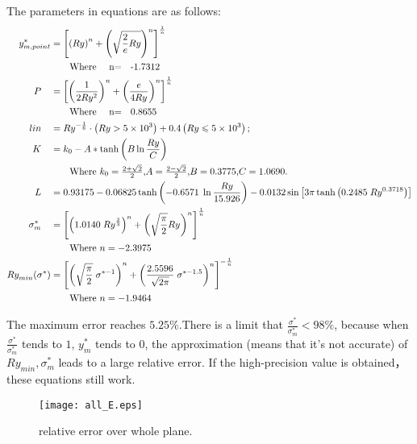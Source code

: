 \documentclass[review, 1p, number, sort&compress,table]{elsarticle}
\begin{document}
		The parameters in equations are as follows:
		\begin{align}
		\nonumber
			y_{m,point}^* &=\left[\left(Ry\right)^n+  \left( \sqrt{\frac{2}{e}Ry}\right)^n  \right]^{\frac{1}{n}}    
			\\ \nonumber &\quad \quad \mbox{\mbox{Where}  \quad  n= \; -1.7312}
			\\ \nonumber
			P \quad      & =\left[\left( \frac{1}{2Ry^{2}}\right)^n+  \left( \frac{e}{4Ry^{}}\right)^n  \right]^{\frac{1}{n}}    
			\\ \nonumber &\quad \quad \mbox{\mbox{Where}  \quad  n= \; 0.8655}
			\\  \nonumber 
			lin \quad      & =  Ry^{-\frac{1}{6}}  \cdot \left(Ry>5\times10^3\right) +0.4\left(Ry \leqslant 5\times10^3\right);   
			\\ \nonumber
			K \quad      &=k_0-A*\tanh{\left(B\ln{\frac{Ry}{C}}\right)}
			\\ \nonumber & \quad \quad \mbox{Where $k_0=\frac{2+\sqrt{2}}{2}$,$A=\frac{2-\sqrt{2}}{2}$,$B=0.3775$,$C=1.0690$.} 
			\\ \nonumber
			L \quad     &= 
			0.93175-0.06825\tanh\left({-0.6571 \; \ln\dfrac{Ry}{15.926}}\right)-0.0132\sin\left[3{\pi}\tanh\left(0.2485 \; Ry^{0.3718}\right)\right]
			\\ \nonumber
			\sigma^{*}_{m}\quad & =\left[ \left( 1.0140 \; Ry^{\frac{2}{3}}\right)^n+ \left( \sqrt{\frac{\pi}{2}}Ry^{}\right)^n\right]^\frac{1}{n}
			\\ \nonumber & \quad \quad\mbox{Where $n=-2.3975$}				
			\\ \nonumber
			Ry_{min}^{}(\sigma^{*})& = \left[ \left( \sqrt{\frac{\pi}{2}}    \; \sigma^{*-1}\right)^n+ \left(\frac{2.5596}{\sqrt{2\pi}} \; \sigma^{*-1.5}\right)^n\right]^{-\frac{1}{n}}	
			\\ \nonumber
				       & \quad \quad \mbox{Where $n=-1.9464$}
		\end{align}
		
		The maximum error reaches $5.25\%$.There is a limit that $\frac{\sigma^*}{\sigma_m^*}<98\%$, because when $\frac{\sigma^*}{\sigma_m^*}$ tends to $1$, $y_m^*$ tends to $0$,  the approximation (means that it's not accurate) of $Ry_{min} , \sigma_m^*$ leads to a large relative error. If the high-precision value is obtained， these equations still work.
		\begin{figure}
				\centering	
				\texttt{[image: all\_E.eps]}
				\caption{relative error over whole plane.}	
				\label{fig:all_E}
		\end{figure}
\end{document}
